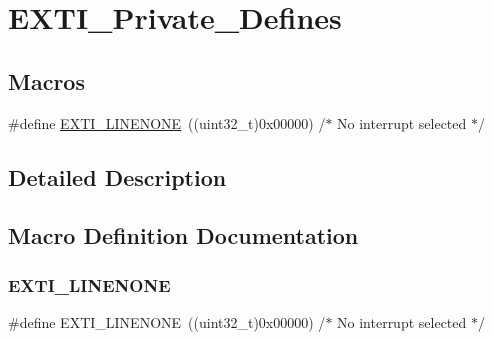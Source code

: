 \hypertarget{group___e_x_t_i___private___defines}{}\section{E\+X\+T\+I\+\_\+\+Private\+\_\+\+Defines}
\label{group___e_x_t_i___private___defines}
\subsection*{Macros}
\begin{DoxyCompactItemize}
\item 
\#define \mbox{\hyperlink{group___e_x_t_i___private___defines_ga4451b67e337fc341394ee695273798af}{E\+X\+T\+I\+\_\+\+L\+I\+N\+E\+N\+O\+NE}}~((uint32\+\_\+t)0x00000)  /$\ast$ No interrupt selected $\ast$/
\end{DoxyCompactItemize}


\subsection{Detailed Description}


\subsection{Macro Definition Documentation}
\mbox{\label{group___e_x_t_i___private___defines_ga4451b67e337fc341394ee695273798af}} 
\subsubsection{\texorpdfstring{EXTI\_LINENONE}{EXTI\_LINENONE}}
{\footnotesize\ttfamily \#define E\+X\+T\+I\+\_\+\+L\+I\+N\+E\+N\+O\+NE~((uint32\+\_\+t)0x00000)  /$\ast$ No interrupt selected $\ast$/}

